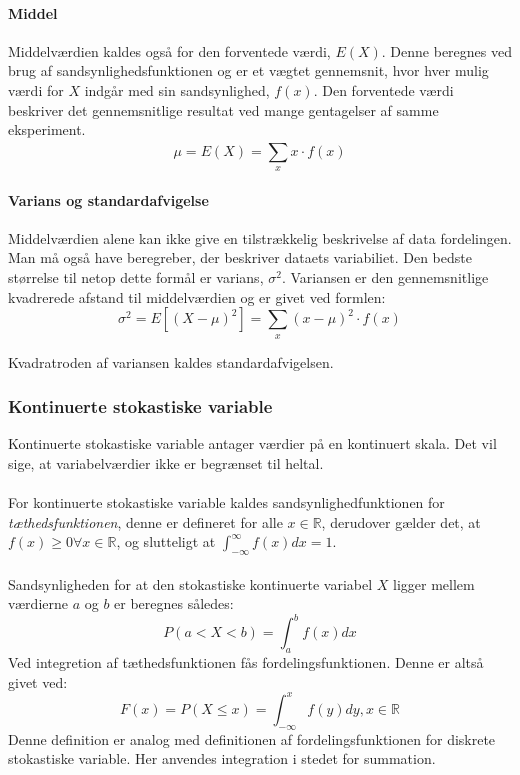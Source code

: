 \paragraph{Middel} Middelværdien kaldes også for den forventede værdi, $E(X)$. Denne beregnes ved brug af sandsynlighedsfunktionen og er et vægtet gennemsnit, hvor hver mulig værdi for $X$ indgår med sin sandsynlighed, $f(x)$. Den forventede værdi beskriver det gennemsnitlige resultat ved mange gentagelser af samme eksperiment.
$$\mu=E(X)=\sum_{x}^{}x \cdot f(x)$$

\paragraph{Varians og standardafvigelse} Middelværdien alene kan ikke give en tilstrækkelig beskrivelse af data fordelingen. Man må også have beregreber, der beskriver dataets variabiliet. Den bedste størrelse til netop dette formål er varians, $\sigma ^2$. Variansen er den gennemsnitlige kvadrerede afstand til middelværdien og er givet ved formlen:
$$\sigma ^2=E[(X-\mu)^2]=\sum_{x}^{}(x-\mu)^2 \cdot f(x)$$

\noindent Kvadratroden af variansen kaldes standardafvigelsen. 

\subsubsection{Kontinuerte stokastiske variable}
Kontinuerte stokastiske variable antager værdier på en kontinuert skala. Det vil sige, at variabelværdier ikke er begrænset til heltal. 
\\
\\
\noindent For kontinuerte stokastiske variable kaldes sandsynlighedfunktionen for \emph{tæthedsfunktionen}, denne er defineret for alle $x \in \mathbb{R}$, derudover gælder det, at $f(x) \ge 0 \forall x \in \mathbb{R}$, 
og slutteligt at $\int_{-\infty}^{\infty} f(x) dx = 1$.
\\
\\ 
\noindent Sandsynligheden for at den stokastiske kontinuerte variabel $X$ ligger mellem værdierne $a$ og $b$ er beregnes således: $$P(a<X<b)=\int_{a}^{b}f(x)dx$$ \noindent Ved integretion af tæthedsfunktionen fås fordelingsfunktionen. Denne er altså givet ved:
$$F(x)=P(X \le x) = \int_{-\infty}^{x}f(y)dy, x\in \mathbb{R}$$
\noindent Denne definition er analog med definitionen af fordelingsfunktionen for diskrete stokastiske variable. Her anvendes integration i stedet for summation.

